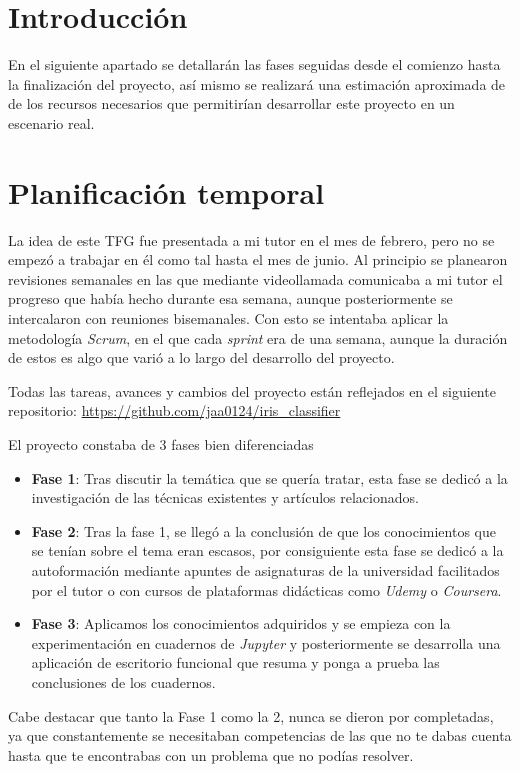 
\section{Introducción}

En el siguiente apartado se detallarán las fases seguidas desde el comienzo hasta la finalización del proyecto, así mismo se realizará una estimación aproximada de de los recursos necesarios que permitirían desarrollar este proyecto en un escenario real.

\section{Planificación temporal}
La idea de este TFG fue presentada a mi tutor en el mes de febrero, pero no se empezó a trabajar en él como tal hasta el mes de junio.
Al principio se planearon revisiones semanales en las que mediante videollamada comunicaba a mi tutor el progreso que había hecho durante esa semana, aunque posteriormente se intercalaron con reuniones bisemanales.
Con esto se intentaba aplicar la metodología \emph{Scrum}, en el que cada \emph{sprint} era de una semana, aunque la duración de estos es algo que varió a lo largo del desarrollo del proyecto.

Todas las tareas, avances y cambios del proyecto están reflejados en el siguiente repositorio: \url{https://github.com/jaa0124/iris_classifier}

El proyecto constaba de 3 fases bien diferenciadas
\begin{itemize}
    \item \textbf{Fase 1}: Tras discutir la temática que se quería tratar, esta fase se dedicó a la investigación de las técnicas existentes y artículos relacionados.
    \item \textbf{Fase 2}: Tras la fase 1, se llegó a la conclusión de que los conocimientos que se tenían sobre el tema eran escasos, por consiguiente esta fase se dedicó a la autoformación mediante apuntes de asignaturas de la universidad facilitados por el tutor o con cursos de plataformas didácticas como \emph{Udemy} o \emph{Coursera}.
    \item \textbf{Fase 3}: Aplicamos los conocimientos adquiridos y se empieza con la experimentación en cuadernos de \emph{Jupyter} y posteriormente se desarrolla una aplicación de escritorio funcional que resuma y ponga a prueba las conclusiones de los cuadernos.

\end{itemize}
Cabe destacar que tanto la Fase 1 como la 2, nunca se dieron por completadas, ya que constantemente se necesitaban competencias de las que no te dabas cuenta hasta que te encontrabas con un problema que no podías resolver.
